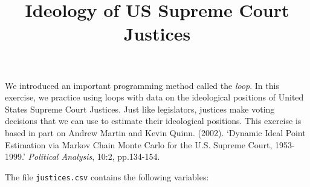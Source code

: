 \documentclass[]{article}
\title{Ideology of US Supreme Court Justices}
\author{}
\date{}
\begin{document}
\maketitle


We introduced an important programming method called the \emph{loop}. In
this exercise, we practice using loops with data on the ideological
positions of United States Supreme Court Justices. Just like
legislators, justices make voting decisions that we can use to estimate
their ideological positions. This exercise is based in part on Andrew
Martin and Kevin Quinn. (2002). `Dynamic Ideal Point Estimation via
Markov Chain Monte Carlo for the U.S. Supreme Court, 1953-1999.'
\emph{Political Analysis}, 10:2, pp.134-154.

The file \texttt{justices.csv} contains the following variables:
\end{document}
